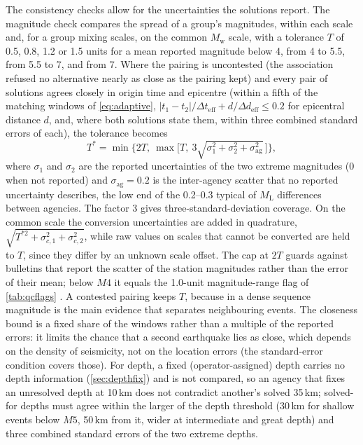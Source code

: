 \documentclass[12pt]{article}
\begin{document}
The consistency checks allow for the uncertainties the solutions report.  The
magnitude check compares the spread of a group's magnitudes, within each scale
and, for a group mixing scales, on the common $M_\mathrm{w}$ scale, with a
tolerance $T$ of 0.5, 0.8, 1.2 or 1.5 units for a mean reported magnitude below
4, from 4 to 5.5, from 5.5 to 7, and from 7.  Where the pairing is uncontested
(the association refused no alternative nearly as close as the pairing kept)
and every pair of solutions agrees closely in origin time and epicentre (within
a fifth of the matching windows of \cref{eq:adaptive},
$|t_1 - t_2|/\Delta t_{\mathrm{eff}} + d/\Delta d_{\mathrm{eff}} \leq 0.2$
for epicentral distance $d$, and, where both solutions state them, within three
combined standard errors of each), the tolerance becomes
\begin{equation*}
  T^{*} = \min\bigl\{2T,\ \max\bigl[T,\ 3\sqrt{\sigma_1^{2} + \sigma_2^{2} + \sigma_\mathrm{ag}^{2}}\,\bigr]\bigr\},
\end{equation*}
where $\sigma_1$ and $\sigma_2$ are the reported uncertainties of the two
extreme magnitudes (0 when not reported) and $\sigma_\mathrm{ag} = 0.2$ is the
inter-agency scatter that no reported uncertainty describes, the low end of the
0.2--0.3 typical of $M_\mathrm{L}$ differences between agencies.  The factor 3
gives three-standard-deviation coverage.  On the common scale the conversion
uncertainties are added in quadrature, $\sqrt{T^{*2} + \sigma_{c,1}^{2} +
\sigma_{c,2}^{2}}$, while raw values on scales that cannot be converted are held
to $T$, since they differ by an unknown scale offset.  The cap at $2T$ guards
against bulletins that report the scatter of the station magnitudes rather than
the error of their mean; below $M4$ it equals the 1.0-unit magnitude-range flag
of \cref{tab:qcflags} \citep{Tanaka2022}.  A contested pairing keeps $T$,
because in a dense sequence magnitude is the main evidence that separates
neighbouring events.  The closeness bound is a fixed share of the windows rather
than a multiple of the reported errors: it limits the chance that a second
earthquake lies as close, which depends on the density of seismicity, not on the
location errors (the standard-error condition covers those).  For depth, a fixed (operator-assigned) depth carries no
depth information (\cref{sec:depthfix}) and is not compared, so an agency that
fixes an unresolved depth at 10\,km does not contradict another's solved 35\,km;
solved-for depths must agree within the larger of the depth threshold (30\,km
for shallow events below $M5$, 50\,km from it, wider at intermediate and great
depth) and three combined standard errors of the two extreme depths.



\end{document}
